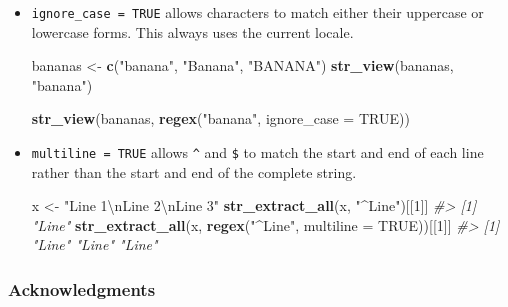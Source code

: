 \documentclass[
]{book}
\newenvironment{Shaded}{\begin{snugshade}}{\end{snugshade}}
\newcommand{\CharTok}[1]{\textcolor[rgb]{0.31,0.60,0.02}{#1}}
\newcommand{\CommentTok}[1]{\textcolor[rgb]{0.56,0.35,0.01}{\textit{#1}}}
\newcommand{\DataTypeTok}[1]{\textcolor[rgb]{0.13,0.29,0.53}{#1}}
\newcommand{\DecValTok}[1]{\textcolor[rgb]{0.00,0.00,0.81}{#1}}
\newcommand{\KeywordTok}[1]{\textcolor[rgb]{0.13,0.29,0.53}{\textbf{#1}}}
\newcommand{\NormalTok}[1]{#1}
\newcommand{\OtherTok}[1]{\textcolor[rgb]{0.56,0.35,0.01}{#1}}
\newcommand{\StringTok}[1]{\textcolor[rgb]{0.31,0.60,0.02}{#1}}
\begin{document}
\begin{itemize}
\item
  \texttt{ignore\_case\ =\ TRUE} allows characters to match either their uppercase or
  lowercase forms. This always uses the current locale.

\begin{Shaded}
\begin{Highlighting}[]
\NormalTok{bananas <-}\StringTok{ }\KeywordTok{c}\NormalTok{(}\StringTok{"banana"}\NormalTok{, }\StringTok{"Banana"}\NormalTok{, }\StringTok{"BANANA"}\NormalTok{)}
\KeywordTok{str_view}\NormalTok{(bananas, }\StringTok{"banana"}\NormalTok{)}
\end{Highlighting}
\end{Shaded}

  \hypertarget{htmlwidget-1834a22cd196f3aa03a1}{}

\begin{Shaded}
\begin{Highlighting}[]
\KeywordTok{str_view}\NormalTok{(bananas, }\KeywordTok{regex}\NormalTok{(}\StringTok{"banana"}\NormalTok{, }\DataTypeTok{ignore_case =} \OtherTok{TRUE}\NormalTok{))}
\end{Highlighting}
\end{Shaded}

  \hypertarget{htmlwidget-28515d92cb327f90c9eb}{}
\item
  \texttt{multiline\ =\ TRUE} allows \texttt{\^{}} and \texttt{\$} to match the start and end of each
  line rather than the start and end of the complete string.

\begin{Shaded}
\begin{Highlighting}[]
\NormalTok{x <-}\StringTok{ "Line 1}\CharTok{\textbackslash{}n}\StringTok{Line 2}\CharTok{\textbackslash{}n}\StringTok{Line 3"}
\KeywordTok{str_extract_all}\NormalTok{(x, }\StringTok{"^Line"}\NormalTok{)[[}\DecValTok{1}\NormalTok{]]}
\CommentTok{#> [1] "Line"}
\KeywordTok{str_extract_all}\NormalTok{(x, }\KeywordTok{regex}\NormalTok{(}\StringTok{"^Line"}\NormalTok{, }\DataTypeTok{multiline =} \OtherTok{TRUE}\NormalTok{))[[}\DecValTok{1}\NormalTok{]]}
\CommentTok{#> [1] "Line" "Line" "Line"}
\end{Highlighting}
\end{Shaded}
\end{itemize}

\hypertarget{acknowledgments-4}{%
\subsubsection*{Acknowledgments}\label{acknowledgments-4}}
\end{document}
